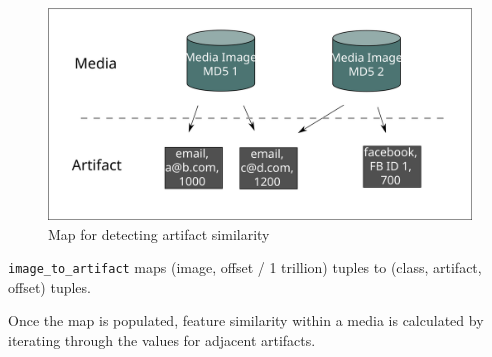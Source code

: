 \documentclass[12pt,twoside]{article}
\begin{document}
\begin{figure}
	\center
	\includegraphics[scale=.45]{offset_similarity}
	\caption{Map for detecting artifact similarity}
	\label{fig:offsetSimilarity}
\end{figure}

\begin{compactitem}
\item \verb+image_to_artifact+ maps (image, offset / 1 trillion) tuples to (class, artifact, offset) tuples.
\end{compactitem}

Once the map is populated, feature similarity within a media is calculated by iterating through the values for adjacent artifacts.
\end{document}
